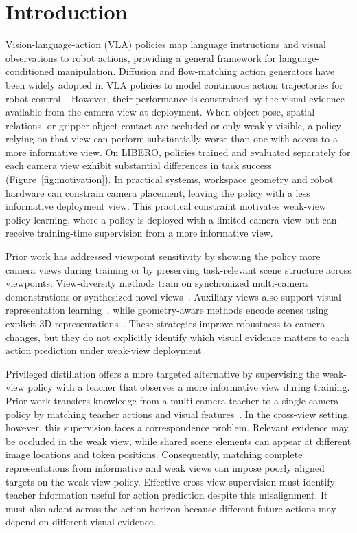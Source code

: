 \section{Introduction}

Vision-language-action (VLA) policies map language instructions and visual observations to robot actions, providing a general framework for language-conditioned manipulation. 
Diffusion and flow-matching action generators have been widely adopted in VLA policies to model continuous action trajectories for robot control~\cite{chi2025diffusionpolicy,wen2025diffusionvla,black2025pi0}.
However, their performance is constrained by the visual evidence available from the camera view at deployment. 
When object pose, spatial relations, or gripper-object contact are occluded or only weakly visible, a policy relying on that view can perform substantially worse than one with access to a more informative view.
On LIBERO, policies trained and evaluated separately for each camera view exhibit substantial differences in task success (Figure~\ref{fig:motivation}).
In practical systems, workspace geometry and robot hardware can constrain camera placement, leaving the policy with a less informative deployment view. 
This practical constraint motivates weak-view policy learning, where a policy is deployed with a limited camera view but can receive training-time supervision from a more informative view.

Prior work has addressed viewpoint sensitivity by showing the policy more camera views during training or by preserving task-relevant scene structure across viewpoints. View-diversity methods train on synchronized multi-camera demonstrations or synthesized novel views~\cite{ablett2021multiview,tian2025vista}. Auxiliary views also support visual representation learning~\cite{seo2023multiview}, while geometry-aware methods encode scenes using explicit 3D representations~\cite{shridhar2023peract,goyal2023rvt}. These strategies improve robustness to camera changes, but they do not explicitly identify which visual evidence matters to each action prediction under weak-view deployment.

Privileged distillation offers a more targeted alternative by supervising the weak-view policy with a teacher that observes a more informative view during training. Prior work transfers knowledge from a multi-camera teacher to a single-camera policy by matching teacher actions and visual features~\cite{acar2024multicamera}. In the cross-view setting, however, this supervision faces a correspondence problem. Relevant evidence may be occluded in the weak view, while shared scene elements can appear at different image locations and token positions. Consequently, matching complete representations from informative and weak views can impose poorly aligned targets on the weak-view policy. Effective cross-view supervision must identify teacher information useful for action prediction despite this misalignment. It must also adapt across the action horizon because different future actions may depend on different visual evidence.

